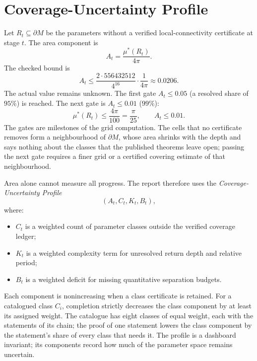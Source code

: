 \documentclass[11pt,a4paper]{article}
\begin{document}
\begin{table}[ht]
  \centering\footnotesize
  
  \caption{The classes of boundary parameters, the statements that each class needs, and their
  status. P: proved in Lean. R: derived in Lean from a geometric statement about the level sets,
  which is itself open. L: motivated by the literature and taken as a hypothesis (the bridge from
  the published theorem is not formalized). O: open. The last four columns count the statements of
  the chain by status.}
  \label{tab:types}
\end{table}

\section{Coverage-Uncertainty Profile}

Let \(R_t\subseteq\partial M\) be the parameters without a verified
local-connectivity certificate at stage \(t\). The area component is
\[
  A_t=\frac{\mu^*(R_t)}{4\pi}.
\]
The checked bound is
\[
  A_t\leq\frac{2\cdot 556432512}{4^{16}}\cdot\frac{1}{4\pi}\approx 0.0206.
\]
The actual value remains unknown. The first gate \(A_t\leq 0.05\) (a resolved
share of \(95\%\)) is reached. The next gate is \(A_t\leq 0.01\) (\(99\%\)):
\[
  \mu^*(R_t)\leq \frac{4\pi}{100}=\frac{\pi}{25},
  \qquad
  A_t\leq 0.01.
\]
The gates are milestones of the grid computation. The cells that no certificate removes
form a neighbourhood of \(\partial M\), whose area shrinks with the depth and says nothing
about the classes that the published theorems leave open; passing the next gate
requires a finer grid or a certified covering estimate of that neighbourhood.

Area alone cannot measure all progress. The report therefore uses the
\emph{Coverage-Uncertainty Profile}
\[
  (A_t,C_t,K_t,B_t),
\]
where:

\begin{itemize}
  \item \(C_t\) is a weighted count of parameter classes outside the verified
        coverage ledger;
  \item \(K_t\) is a weighted complexity term for unresolved return depth and
        relative period;
  \item \(B_t\) is a weighted deficit for missing quantitative separation
        budgets.
\end{itemize}

Each component is nonincreasing when a class certificate is retained. For a
catalogued class \(C_i\), completion strictly decreases the class component
by at least its assigned weight. The catalogue has eight classes of equal
weight, each with the statements of its chain; the proof of one statement lowers the
class component by the statement's share of every class that needs it. The profile
is a dashboard invariant; its components record how much of the parameter space
remains uncertain.
\end{document}
